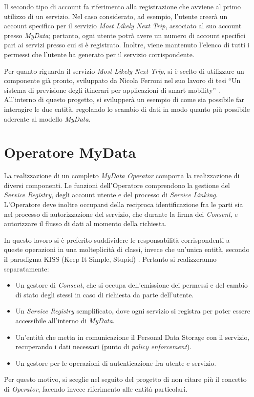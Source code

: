 Il secondo tipo di account fa riferimento alla registrazione che avviene al primo utilizzo di un servizio. Nel caso considerato, ad esempio, l’utente creer\`a un account specifico per il servizio \textit{Most Likely Next Trip}, associato al suo account presso \textit{MyData}; pertanto, ogni utente potr\`a avere un numero di account specifici pari ai servizi presso cui si \`e registrato. Inoltre, viene mantenuto l’elenco di tutti i permessi che l’utente ha generato per il servizio corrispondente.

Per quanto riguarda il servizio \textit{Most Likely Next Trip}, si \`e scelto di utilizzare un componente gi\`a pronto, sviluppato da Nicola Ferroni nel suo lavoro di tesi “Un sistema di previsione degli itinerari per applicazioni di smart mobility” \cite{MLNT}.  All’interno di questo progetto, si svilupper\`a un esempio di come sia possibile far interagire le due entit\`a, regolando lo scambio di dati in modo quanto pi\`u possibile aderente al modello \textit{MyData}.

\section{Operatore MyData}
\label{sec:A-mydataop}
La realizzazione di un completo \textit{MyData Operator} comporta la realizzazione di diversi componenti. Le funzioni dell’Operatore comprendono la gestione del \textit{Service Registry}, degli account utente e del processo di \textit{Service Linking}. L’Operatore deve inoltre occuparsi della reciproca identificazione fra le parti sia nel processo di autorizzazione del servizio, che durante la firma dei \textit{Consent}, e autorizzare il flusso di dati al momento della richiesta.

In questo lavoro si \`e preferito suddividere le responsabilit\`a corrispondenti a queste operazioni in una molteplicit\`a di classi, invece che un’unica entit\`a, secondo il paradigma KISS (Keep It Simple, Stupid) \cite{kissprinciple}. Pertanto si realizzeranno separatamente:
\begin{itemize}
	\item Un gestore di \textit{Consent}, che si occupa dell’emissione dei permessi e del cambio di stato degli stessi in caso di richiesta da parte dell’utente.
	\item Un \textit{Service Registry} semplificato, dove ogni servizio si registra per poter essere accessibile all’interno di \textit{MyData}.
	\item Un’entit\`a che metta in comunicazione il Personal Data Storage con il servizio, recuperando i dati necessari (punto di \textit{policy enforcement}).
	\item Un gestore per le operazioni di autenticazione fra utente e servizio.
\end{itemize}
Per questo motivo, si sceglie nel seguito del progetto di non citare pi\`u il concetto di \textit{Operator}, facendo invece riferimento alle entit\`a particolari.

